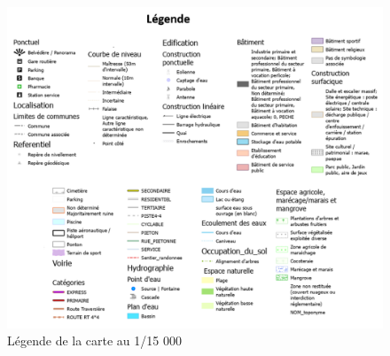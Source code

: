 \documentclass{themeensg}
\begin{document}
\begin{appendices}
\begin{figure}[!h]
\centering
\includegraphics[width=\linewidth]{images/Annexes/Resultat/legende_15.png}
\caption{Légende de la carte au 1/15 000}
\label{15000_legende}
\end{figure}


\end{appendices}
\end{document}
